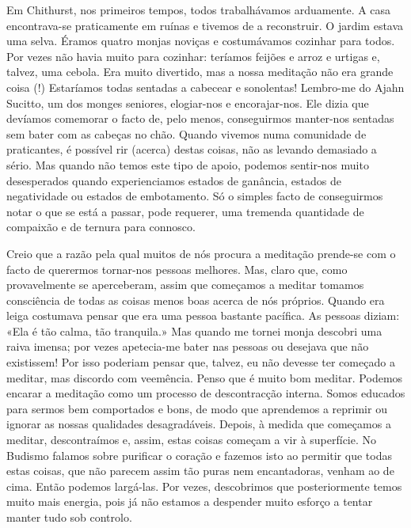 Em Chithurst, nos primeiros tempos, todos trabalhávamos arduamente. A
casa encontrava-se praticamente em ruínas e tivemos de a reconstruir. O
jardim estava uma selva. Éramos quatro monjas noviças e costumávamos
cozinhar para todos. Por vezes não havia muito para cozinhar: teríamos
feijões e arroz e urtigas e, talvez, uma cebola. Era muito divertido,
mas a nossa meditação não era grande coisa (!) Estaríamos todas
sentadas a cabecear e sonolentas! Lembro-me do Ajahn Sucitto, um dos
monges seniores, elogiar-nos e encorajar-nos. Ele dizia que devíamos
comemorar o facto de, pelo menos, conseguirmos manter-nos sentadas sem
bater com as cabeças no chão. Quando vivemos numa comunidade de
praticantes, é possível rir (acerca) destas coisas, não as levando
demasiado a sério. Mas quando não temos este tipo de apoio, podemos
sentir-nos muito desesperados quando experienciamos estados de ganância,
estados de negatividade ou estados de embotamento. Só o simples facto de
conseguirmos notar o que se está a passar, pode requerer, uma tremenda
quantidade de compaixão e de ternura para connosco.

Creio que a razão pela qual muitos de nós procura a meditação prende-se
com o facto de querermos tornar-nos pessoas melhores. Mas, claro que,
como provavelmente se aperceberam, assim que começamos a meditar tomamos
consciência de todas as coisas menos boas acerca de nós próprios. Quando
era leiga costumava pensar que era uma pessoa bastante pacífica. As
pessoas diziam: «Ela é tão calma, tão tranquila.» Mas quando me tornei
monja descobri uma raiva imensa; por vezes apetecia-me bater nas pessoas
ou desejava que não existissem! Por isso poderiam pensar que, talvez, eu
não devesse ter começado a meditar, mas discordo com veemência. Penso
que é muito bom meditar. Podemos encarar a meditação como um processo de
descontracção interna. Somos educados para sermos bem comportados e
bons, de modo que aprendemos a reprimir ou ignorar as nossas qualidades
desagradáveis. Depois, à medida que começamos a meditar, descontraímos
e, assim, estas coisas começam a vir à superfície. No Budismo falamos
sobre purificar o coração e fazemos isto ao permitir que todas estas
coisas, que não parecem assim tão puras nem encantadoras, venham ao de
cima. Então podemos largá-las. Por vezes, descobrimos que posteriormente
temos muito mais energia, pois já não estamos a despender muito esforço
a tentar manter tudo sob controlo.


